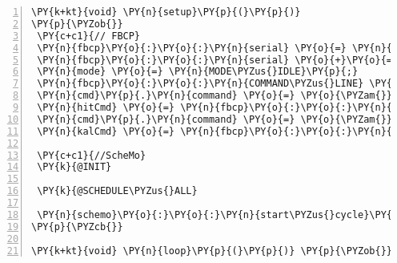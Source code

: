\begin{Verbatim}[commandchars=\\\{\},numbers=left,firstnumber=1,stepnumber=1,frame=leftline,numbersep=0pt]
\PY{k+kt}{void} \PY{n}{setup}\PY{p}{(}\PY{p}{)}
\PY{p}{\PYZob{}}
 \PY{c+c1}{// FBCP}
 \PY{n}{fbcp}\PY{o}{:}\PY{o}{:}\PY{n}{serial} \PY{o}{=} \PY{n}{fbcp}\PY{o}{:}\PY{o}{:}\PY{n}{ROBOT\PYZus{}PREFIX}\PY{p}{;}
 \PY{n}{fbcp}\PY{o}{:}\PY{o}{:}\PY{n}{serial} \PY{o}{+}\PY{o}{=} \PY{n}{serial}\PY{p}{;}
 \PY{n}{mode} \PY{o}{=} \PY{n}{MODE\PYZus{}IDLE}\PY{p}{;}
 \PY{n}{fbcp}\PY{o}{:}\PY{o}{:}\PY{n}{COMMAND\PYZus{}LINE} \PY{n}{cmd}\PY{p}{;}
 \PY{n}{cmd}\PY{p}{.}\PY{n}{command} \PY{o}{=} \PY{o}{\PYZam{}}\PY{n}{fbcp}\PY{o}{:}\PY{o}{:}\PY{n}{Q\PYZus{}HIT}\PY{p}{;}
 \PY{n}{hitCmd} \PY{o}{=} \PY{n}{fbcp}\PY{o}{:}\PY{o}{:}\PY{n}{writeCommand}\PY{p}{(}\PY{n}{cmd}\PY{p}{)}\PY{p}{;}
 \PY{n}{cmd}\PY{p}{.}\PY{n}{command} \PY{o}{=} \PY{o}{\PYZam{}}\PY{n}{fbcp}\PY{o}{:}\PY{o}{:}\PY{n}{Q\PYZus{}HEARTBEAT}\PY{p}{;}
 \PY{n}{kalCmd} \PY{o}{=} \PY{n}{fbcp}\PY{o}{:}\PY{o}{:}\PY{n}{writeCommand}\PY{p}{(}\PY{n}{cmd}\PY{p}{)}\PY{p}{;}
 
 \PY{c+c1}{//ScheMo}
 \PY{k}{@INIT}

 \PY{k}{@SCHEDULE\PYZus{}ALL}

 \PY{n}{schemo}\PY{o}{:}\PY{o}{:}\PY{n}{start\PYZus{}cycle}\PY{p}{(}\PY{p}{)}\PY{p}{;}
\PY{p}{\PYZcb{}}

\PY{k+kt}{void} \PY{n}{loop}\PY{p}{(}\PY{p}{)} \PY{p}{\PYZob{}}\PY{p}{\PYZcb{}}
\end{Verbatim}
